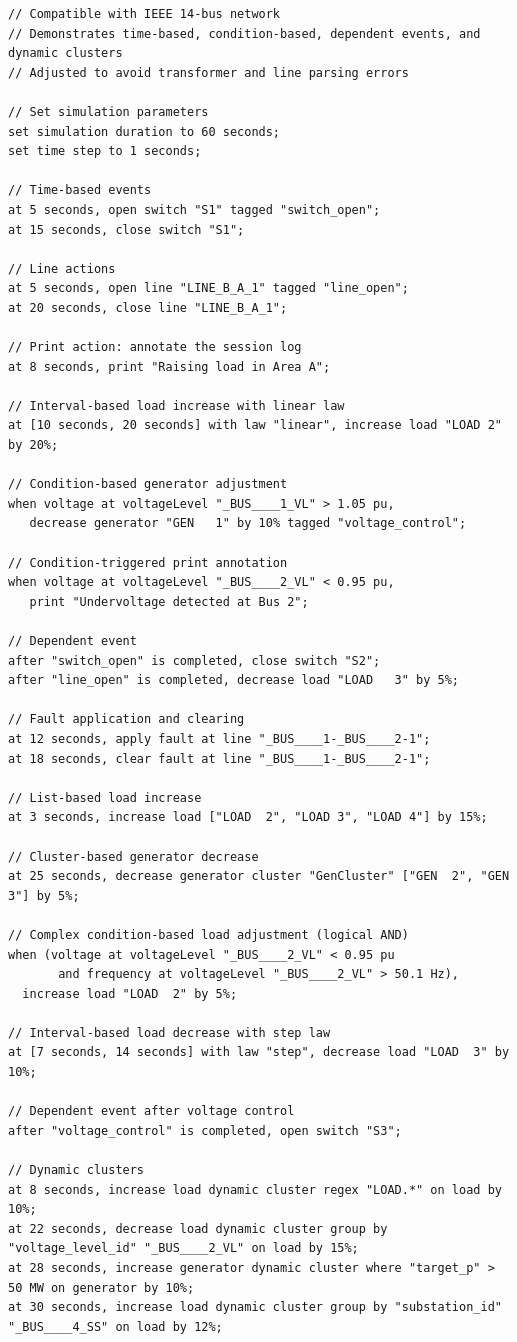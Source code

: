 \documentclass[12pt]{article}
\begin{document}
\begin{lstlisting}
// Compatible with IEEE 14-bus network
// Demonstrates time-based, condition-based, dependent events, and dynamic clusters
// Adjusted to avoid transformer and line parsing errors

// Set simulation parameters
set simulation duration to 60 seconds;
set time step to 1 seconds;

// Time-based events
at 5 seconds, open switch "S1" tagged "switch_open";
at 15 seconds, close switch "S1";

// Line actions
at 5 seconds, open line "LINE_B_A_1" tagged "line_open";
at 20 seconds, close line "LINE_B_A_1";

// Print action: annotate the session log
at 8 seconds, print "Raising load in Area A";

// Interval-based load increase with linear law
at [10 seconds, 20 seconds] with law "linear", increase load "LOAD 2" by 20%;

// Condition-based generator adjustment
when voltage at voltageLevel "_BUS____1_VL" > 1.05 pu,
   decrease generator "GEN   1" by 10% tagged "voltage_control";

// Condition-triggered print annotation
when voltage at voltageLevel "_BUS____2_VL" < 0.95 pu,
   print "Undervoltage detected at Bus 2";

// Dependent event
after "switch_open" is completed, close switch "S2";
after "line_open" is completed, decrease load "LOAD   3" by 5%;

// Fault application and clearing
at 12 seconds, apply fault at line "_BUS____1-_BUS____2-1";
at 18 seconds, clear fault at line "_BUS____1-_BUS____2-1";

// List-based load increase
at 3 seconds, increase load ["LOAD  2", "LOAD 3", "LOAD 4"] by 15%;

// Cluster-based generator decrease
at 25 seconds, decrease generator cluster "GenCluster" ["GEN  2", "GEN 3"] by 5%;

// Complex condition-based load adjustment (logical AND)
when (voltage at voltageLevel "_BUS____2_VL" < 0.95 pu
       and frequency at voltageLevel "_BUS____2_VL" > 50.1 Hz),
  increase load "LOAD  2" by 5%;

// Interval-based load decrease with step law
at [7 seconds, 14 seconds] with law "step", decrease load "LOAD  3" by 10%;

// Dependent event after voltage control
after "voltage_control" is completed, open switch "S3";

// Dynamic clusters
at 8 seconds, increase load dynamic cluster regex "LOAD.*" on load by 10%;
at 22 seconds, decrease load dynamic cluster group by "voltage_level_id" "_BUS____2_VL" on load by 15%;
at 28 seconds, increase generator dynamic cluster where "target_p" > 50 MW on generator by 10%;
at 30 seconds, increase load dynamic cluster group by "substation_id" "_BUS____4_SS" on load by 12%;
\end{lstlisting}
\end{document}

